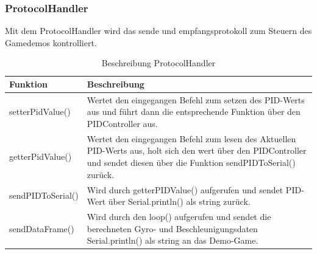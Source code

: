 \subsubsection{ProtocolHandler}
Mit dem ProtocolHandler wird das sende und empfangsprotokoll zum Steuern des Gamedemos kontrolliert.
\begin{table}[H]
  \centering
  \settowidth{}
  \setlength\extrarowheight{2pt}
  \begin{tabulary}{1.0\textwidth}{|L|L|}
    \hline
    \textbf{Funktion} &
    \textbf{Beschreibung}\\
    \hline
    setterPidValue() &
    Wertet den eingegangen Befehl zum setzen des PID-Werts aus und führt dann die entsprechende Funktion über den PIDController aus. \\
    \hline
    getterPidValue() &
    Wertet den eingegangen Befehl zum lesen des Aktuellen PID-Werts aus, holt sich den wert über den PIDController und sendet diesen über die Funktion sendPIDToSerial() zurück.\\
    \hline
    sendPIDToSerial() & 
    Wird durch getterPIDValue() aufgerufen und sendet PID-Wert über Serial.println() als string zurück.\\
    \hline
    sendDataFrame() &
    Wird durch den loop() aufgerufen und sendet die berechneten Gyro- und Beschleunigungsdaten Serial.println() als string an das Demo-Game.\\
    \hline
  \end{tabulary}
  \caption{Beschreibung ProtocolHandler}
\end{table}